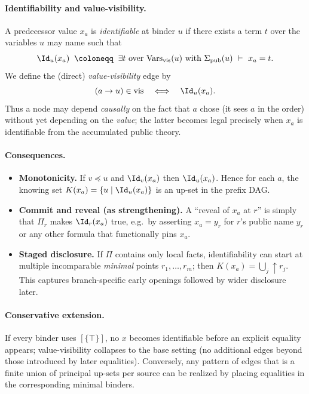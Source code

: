 \paragraph{Identifiability and value-visibility.}
A predecessor value $x_a$ is \emph{identifiable} at binder $u$ if there exists
a term $t$ over the variables $u$ may name such that
\[
  \Id_u(x_a) \;\;\coloneqq\;\; \exists t\ \text{over }\mathrm{Vars}_{\mathrm{vis}}(u)
  \text{ with } \Sigma_{\mathrm{pub}}(u)\ \vdash\ x_a = t .
\]
We define the (direct) \emph{value-visibility} edge by
\[
  (a \to u) \in \mathrm{vis} \quad\Longleftrightarrow\quad \Id_u(x_a).
\]
Thus a node may depend \emph{causally} on the fact that $a$ chose (it sees $a$
in the order) without yet depending on the \emph{value}; the latter becomes
legal precisely when $x_a$ is identifiable from the accumulated public theory.

\paragraph{Consequences.}
\begin{itemize}
  \item \textbf{Monotonicity.} If $v\preceq u$ and $\Id_v(x_a)$ then
  $\Id_u(x_a)$. Hence for each $a$, the knowing set
  $K(x_a)=\{u \mid \Id_u(x_a)\}$ is an up-set in the prefix DAG.
  \item \textbf{Commit and reveal (as strengthening).}
  A ``reveal of $x_a$ at $r$'' is simply that $\Pi_r$ makes $\Id_r(x_a)$ true,
  e.g.\ by asserting $x_a=y_r$ for $r$'s public name $y_r$ or any other formula
  that functionally pins $x_a$.
  \item \textbf{Staged disclosure.}
  If $\Pi$ contains only local facts, identifiability can start at multiple
  incomparable \emph{minimal} points $r_1,\dots,r_m$; then
  $K(x_a)=\bigcup_j \uparrow r_j$. This captures branch-specific early openings
  followed by wider disclosure later.
\end{itemize}

\paragraph{Conservative extension.}
If every binder uses $[\{\top\}]$, no $x$ becomes identifiable before an
explicit equality appears; value-visibility collapses to the base setting (no
additional edges beyond those introduced by later equalities). Conversely, any
pattern of edges that is a finite union of principal up-sets per source can be
realized by placing equalities in the corresponding minimal binders.

